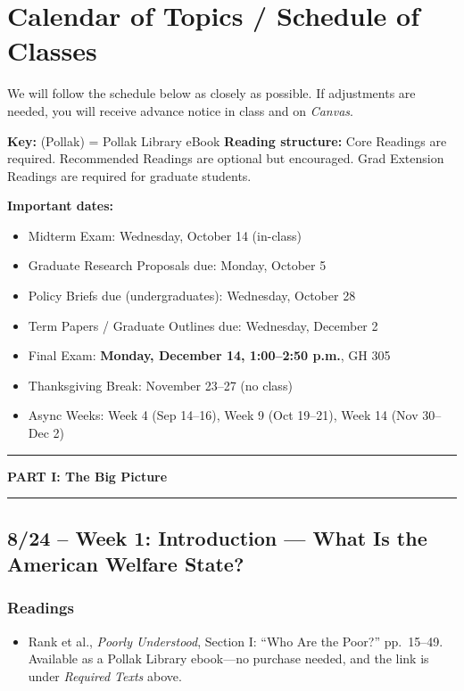 \documentclass[12pt]{article}
\begin{document}
\section*{Calendar of Topics / Schedule of Classes}

We will follow the schedule below as closely as possible. If adjustments are needed, you will receive advance notice in class and on \emph{Canvas}.

\vspace{0.5em}
\noindent \textbf{Key:} (Pollak) = Pollak Library eBook
\noindent \textbf{Reading structure:} Core Readings are required. Recommended Readings are optional but encouraged. Grad Extension Readings are required for graduate students.

\vspace{0.5em}
\noindent \textbf{Important dates:}
\begin{itemize}
    \item Midterm Exam: Wednesday, October 14 (in-class)
    \item Graduate Research Proposals due: Monday, October 5
    \item Policy Briefs due (undergraduates): Wednesday, October 28
    \item Term Papers / Graduate Outlines due: Wednesday, December 2
    \item Final Exam: \textbf{Monday, December 14, 1:00--2:50 p.m.}, GH 305
    \item Thanksgiving Break: November 23--27 (no class)
    \item Async Weeks: Week 4 (Sep 14--16), Week 9 (Oct 19--21), Week 14 (Nov 30--Dec 2)
\end{itemize}

\bigskip

\noindent\rule{\textwidth}{0.6pt}
\begin{center}\textbf{PART I: The Big Picture}\end{center}
\noindent\rule{\textwidth}{0.6pt}

\subsection*{8/24 -- Week 1: Introduction --- What Is the American Welfare State?}
    \subsubsection*{Readings}
        \begin{itemize}
            \item Rank et al., \emph{Poorly Understood}, Section I: ``Who Are the Poor?'' pp.\ 15--49. Available as a Pollak Library ebook---no purchase needed, and the link is under \emph{Required Texts} above.
        \end{itemize}
\end{document}
